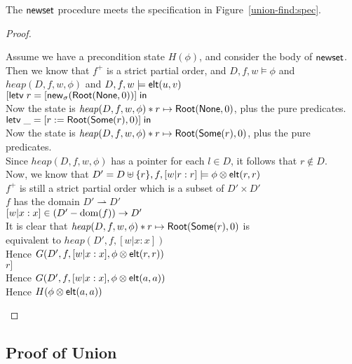 \begin{lemma}
The $\mathsf{newset}$ procedure meets the specification in Figure~\ref{union-find:spec}. 
\end{lemma}

\begin{proof}
\begin{tabbedproof}
\oo Assume we have a precondition state $H(\phi)$, and consider the body of $\mathsf{newset}$. \\
\ooo Then we know that $f^+$ is a strict partial order, and $D,f,w \models \phi$ and \\
\oox $\mathit{heap}(D,f,w,\phi)$ and $D,f,w \models \mathsf{elt}({u}, {v})$ \\
\ooo $[\mathsf{letv}\;r = [\mathsf{new}_{\sigma}(\mathsf{Root}(\mathsf{None}, 0))]\;\mathsf{in}\;$ \\
\ooo Now the state is $\mathit{heap}(D,f,w,\phi) * r \mapsto \mathsf{Root}(\mathsf{None}, 0)$, plus the pure predicates. \\
\ooo $\mathsf{letv}\;\_ = [r := \mathsf{Root}(\mathsf{Some}(r), 0)]\;\mathsf{in}\;$ \\
\ooo Now the state is $\mathit{heap}(D,f,w,\phi) * r \mapsto \mathsf{Root}(\mathsf{Some}(r), 0)$, plus the pure predicates. \\
\ooo Since $\mathit{heap}(D,f,w,\phi)$ has a pointer for each $l \in D$, it follows that $r \not \in D$. \\
\ooo Now, we know that $D' = D \uplus \{{r}\}, f, [w|r:r] \models \phi \otimes \mathsf{elt}({r}, {r})$ \\ 
\ooo $f^+$ is still a strict partial order which is a subset of $D' \times D'$ \\
\ooo $f$ has the domain $D' \rightharpoonup D'$ \\
\ooo $[w|x:x] \in (D' - \mbox{dom}({f})) \to D'$ \\
\ooo It is clear that $\mathit{heap}(D,f,w,\phi) * r \mapsto \mathsf{Root}(\mathsf{Some}(r), 0)$ is \\
\oox equivalent to $\mathit{heap}(D', f, [w|x:x])$ \\
\ooo Hence $G(D', f, [w|x:x], \phi \otimes \mathsf{elt}({r}, {r}))$ \\
\ooo $r]$ \\
\ooo Hence $G(D', f, [w|x:x], \phi \otimes \mathsf{elt}({a}, {a}))$ \\
\ooo Hence $H(\phi \otimes \mathsf{elt}({a}, {a}))$ 
\end{tabbedproof}
\end{proof}

\subsection{Proof of Union}

